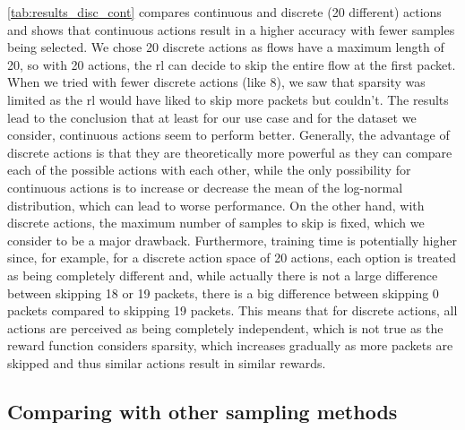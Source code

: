 \documentclass[conference]{IEEEtran}
\begin{document}
\autoref{tab:results_disc_cont} compares continuous and discrete (20 different) actions and shows that continuous actions result in a higher accuracy with fewer samples being selected. We chose 20 discrete actions as flows have a maximum length of 20, so with 20 actions, the \gls{rl} can decide to skip the entire flow at the first packet. When we tried with fewer discrete actions (like 8), we saw that sparsity was limited as the \gls{rl} would have liked to skip more packets but couldn't. The results lead to the conclusion that at least for our use case and for the dataset we consider, continuous actions seem to perform better. Generally, the advantage of discrete actions is that they are theoretically more powerful as they can compare each of the possible actions with each other, while the only possibility for continuous actions is to increase or decrease the mean of the log-normal distribution, which can lead to worse performance. On the other hand, with discrete actions, the maximum number of samples to skip is fixed, which we consider to be a major drawback. Furthermore, training time is potentially higher since, for example, for a discrete action space of 20 actions, each option is treated as being completely different and, while actually there is not a large difference between skipping 18 or 19 packets, there is a big difference between skipping 0 packets compared to skipping 19 packets. This means that for discrete actions, all actions are perceived as being completely independent, which is not true as the reward function considers sparsity, which increases gradually as more packets are skipped and thus similar actions result in similar rewards.

\subsection{Comparing with other sampling methods}
\end{document}
